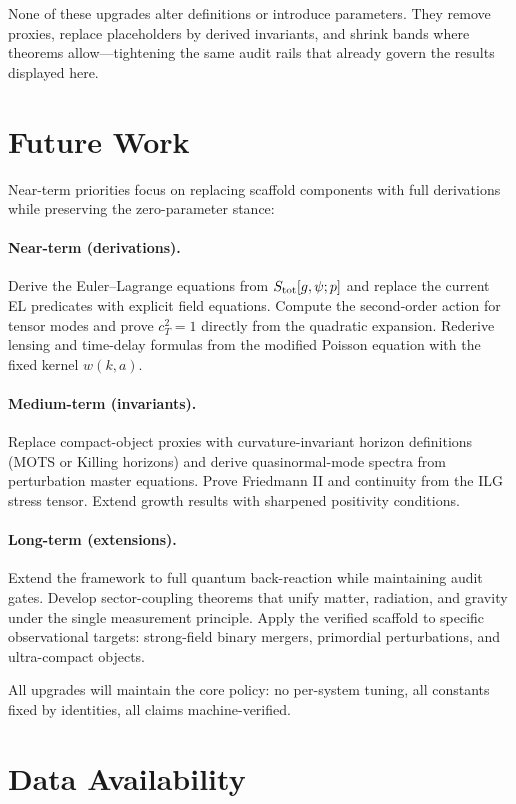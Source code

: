 \documentclass[12pt,a4paper]{article}
\begin{document}
None of these upgrades alter definitions or introduce parameters. They remove proxies, replace placeholders by derived invariants, and shrink bands where theorems allow—tightening the same audit rails that already govern the results displayed here.

\section{Future Work}

Near-term priorities focus on replacing scaffold components with full derivations while preserving the zero-parameter stance:

\paragraph{Near-term (derivations).}
Derive the Euler–Lagrange equations from $S_{\rm tot}[g,\psi;p]$ and replace the current EL predicates with explicit field equations. Compute the second-order action for tensor modes and prove $c_T^2=1$ directly from the quadratic expansion. Rederive lensing and time-delay formulas from the modified Poisson equation with the fixed kernel $w(k,a)$.

\paragraph{Medium-term (invariants).}
Replace compact-object proxies with curvature-invariant horizon definitions (MOTS or Killing horizons) and derive quasinormal-mode spectra from perturbation master equations. Prove Friedmann II and continuity from the ILG stress tensor. Extend growth results with sharpened positivity conditions.

\paragraph{Long-term (extensions).}
Extend the framework to full quantum back-reaction while maintaining audit gates. Develop sector-coupling theorems that unify matter, radiation, and gravity under the single measurement principle. Apply the verified scaffold to specific observational targets: strong-field binary mergers, primordial perturbations, and ultra-compact objects.

All upgrades will maintain the core policy: no per-system tuning, all constants fixed by identities, all claims machine-verified.

\section*{Data Availability}
\end{document}
